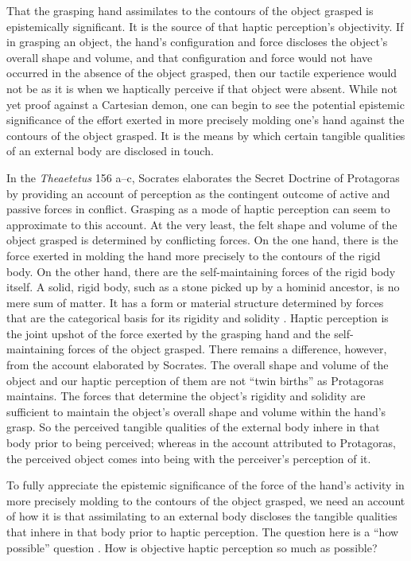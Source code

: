 \documentclass[12pt]{article}
\begin{document}
That the grasping hand assimilates to the contours of the object grasped is epistemically significant. It is the source of that haptic perception's objectivity. If in grasping an object, the hand's configuration and force discloses the object's overall shape and volume, and that configuration and force would not have occurred in the absence of the object grasped, then our tactile experience would not be as it is when we haptically perceive if that object were absent. While not yet proof against a Cartesian demon, one can begin to see the potential epistemic significance of the effort exerted in more precisely molding one's hand against the contours of the object grasped. It is the means by which certain tangible qualities of an external body are disclosed in touch. 

In the \emph{Theaetetus} 156 a--c, Socrates elaborates the Secret Doctrine of Protagoras by providing an account of perception as the contingent outcome of active and passive forces in conflict. Grasping as a mode of haptic perception can seem to approximate to this account. At the very least, the felt shape and volume of the object grasped is determined by conflicting forces. On the one hand, there is the force exerted in molding the hand more precisely to the contours of the rigid body. On the other hand, there are the self-maintaining forces of the rigid body itself. A solid, rigid body, such as a stone picked up by a hominid ancestor, is no mere sum of matter. It has a form or material structure determined by forces that are the categorical basis for its rigidity and solidity \citep{Johnston:2006js}. Haptic perception is the joint upshot of the force exerted by the grasping hand and the self-maintaining forces of the object grasped. There remains a difference, however, from the account elaborated by Socrates. The overall shape and volume of the object and our haptic perception of them are not ``twin births'' as Protagoras maintains. The forces that determine the object's rigidity and solidity are sufficient to maintain the object's overall shape and volume within the hand's grasp. So the perceived tangible qualities of the external body inhere in that body prior to being perceived; whereas in the account attributed to Protagoras, the perceived object comes into being with the perceiver's perception of it.

To fully appreciate the epistemic significance of the force of the hand's activity in more precisely molding to the contours of the object grasped, we need an account of how it is that assimilating to an external body discloses the tangible qualities that inhere in that body prior to haptic perception. The question here is a ``how possible'' question \citep{Cassam:2007lq}. How is objective haptic perception so much as possible?
\end{document}
